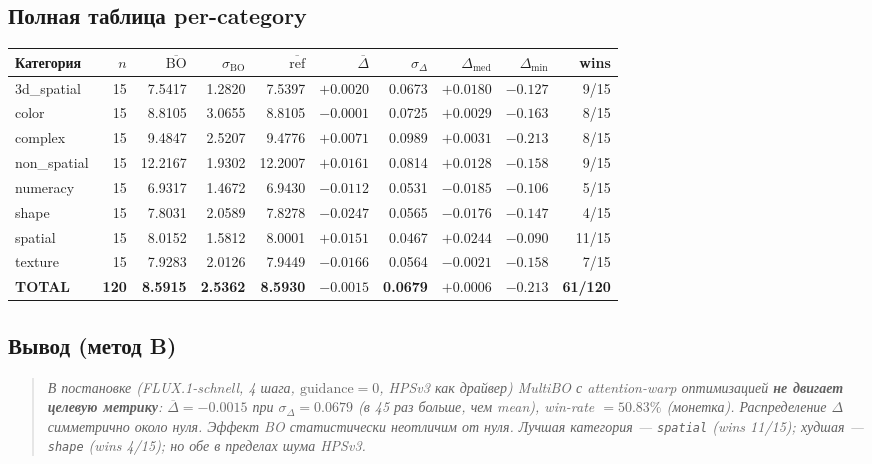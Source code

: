 \documentclass[11pt,a4paper]{article}
\begin{document}
\subsection{Полная таблица per-category}

\begin{center}
\renewcommand{\arraystretch}{1.05}
\footnotesize
\begin{tabular}{lrrrrrrrrr}
\toprule
Категория & $n$ & $\overline{\text{BO}}$ & $\sigma_\text{BO}$ & $\overline{\text{ref}}$ & $\overline{\Delta}$ & $\sigma_\Delta$ & $\Delta_\text{med}$ & $\Delta_\text{min}$ & wins \\
\midrule
3d\_spatial  & 15 & 7.5417  & 1.2820 & 7.5397  & $+0.0020$ & 0.0673 & $+0.0180$ & $-0.127$ & 9/15 \\
color        & 15 & 8.8105  & 3.0655 & 8.8105  & $-0.0001$ & 0.0725 & $+0.0029$ & $-0.163$ & 8/15 \\
complex      & 15 & 9.4847  & 2.5207 & 9.4776  & $+0.0071$ & 0.0989 & $+0.0031$ & $-0.213$ & 8/15 \\
non\_spatial & 15 & 12.2167 & 1.9302 & 12.2007 & $+0.0161$ & 0.0814 & $+0.0128$ & $-0.158$ & 9/15 \\
numeracy     & 15 & 6.9317  & 1.4672 & 6.9430  & $-0.0112$ & 0.0531 & $-0.0185$ & $-0.106$ & 5/15 \\
shape        & 15 & 7.8031  & 2.0589 & 7.8278  & $-0.0247$ & 0.0565 & $-0.0176$ & $-0.147$ & 4/15 \\
spatial      & 15 & 8.0152  & 1.5812 & 8.0001  & $+0.0151$ & 0.0467 & $+0.0244$ & $-0.090$ & 11/15 \\
texture      & 15 & 7.9283  & 2.0126 & 7.9449  & $-0.0166$ & 0.0564 & $-0.0021$ & $-0.158$ & 7/15 \\
\midrule
\textbf{TOTAL} & \textbf{120} & \textbf{8.5915} & \textbf{2.5362} & \textbf{8.5930} & $\bm{-0.0015}$ & \textbf{0.0679} & $\bm{+0.0006}$ & $\bm{-0.213}$ & \textbf{61/120} \\
\bottomrule
\end{tabular}
\end{center}

\subsection{Вывод (метод B)}

\begin{quote}
\itshape
В постановке (FLUX.1-schnell, 4 шага, $\text{guidance}=0$, HPSv3 как
драйвер) MultiBO с attention-warp оптимизацией \textbf{не двигает целевую
метрику}: $\overline{\Delta} = -0.0015$ при $\sigma_\Delta = 0.0679$
(в 45 раз больше, чем mean), win-rate $= 50.83\%$ (монетка).
Распределение $\Delta$ симметрично около нуля. Эффект BO статистически
неотличим от нуля. Лучшая категория --- \texttt{spatial} (wins 11/15);
худшая --- \texttt{shape} (wins 4/15); но обе в пределах шума HPSv3.
\end{quote}
\end{document}
